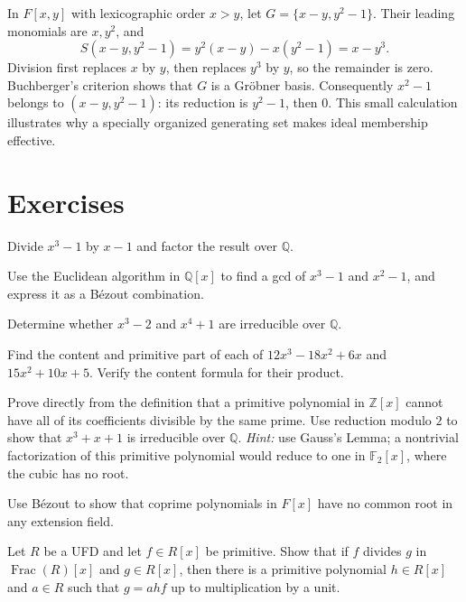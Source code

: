 \begin{example}
In \(F[x,y]\) with lexicographic order \(x>y\), let
\(G=\{x-y,y^2-1\}\).  Their leading monomials are \(x,y^2\), and
\[
S(x-y,y^2-1)=y^2(x-y)-x(y^2-1)=x-y^3.
\]
Division first replaces \(x\) by \(y\), then replaces \(y^3\) by \(y\),
so the remainder is zero.  Buchberger's criterion shows that \(G\) is a
Gr\"obner basis.  Consequently \(x^2-1\) belongs to \((x-y,y^2-1)\): its
reduction is \(y^2-1\), then \(0\).  This small calculation illustrates why
a specially organized generating set makes ideal membership effective.
\end{example}

\section*{Exercises}
\begin{exercise}[Basic] Divide \(x^3-1\) by \(x-1\) and factor the result over \(\mathbb Q\). \end{exercise}
\begin{exercise}[Core] Use the Euclidean algorithm in \(\mathbb Q[x]\) to
find a gcd of \(x^3-1\) and \(x^2-1\), and express it as a B\'ezout combination.
\end{exercise}
\begin{exercise}[Core] Determine whether \(x^3-2\) and \(x^4+1\) are irreducible over \(\mathbb Q\). \end{exercise}
\begin{exercise}[Core] Find the content and primitive part of each of
\(12x^3-18x^2+6x\) and \(15x^2+10x+5\).  Verify the content formula for
their product. \end{exercise}
\begin{exercise}[Core] Prove directly from the definition that a primitive
polynomial in \(\mathbb Z[x]\) cannot have all of its coefficients divisible
by the same prime.  Use reduction modulo \(2\) to show that
\(x^3+x+1\) is irreducible over \(\mathbb Q\).
\emph{Hint:} use Gauss's Lemma; a nontrivial factorization of this primitive
polynomial would reduce to one in \(\mathbb F_2[x]\), where the cubic has no
root. \end{exercise}
\begin{exercise}[Further] Use B\'ezout to show that coprime polynomials in \(F[x]\) have no common root in any extension field. \end{exercise}
\begin{exercise} Let \(R\) be a UFD and let
\(f\in R[x]\) be primitive.  Show that if \(f\) divides \(g\) in
\(\operatorname{Frac}(R)[x]\) and \(g\in R[x]\), then there is a
primitive polynomial \(h\in R[x]\) and \(a\in R\) such that
\(g=ahf\) up to multiplication by a unit. \end{exercise}
